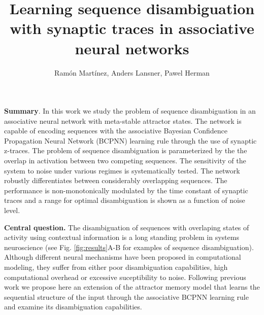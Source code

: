\documentclass[12pt, a4paper]{article}
\title{\vspace{-1.8cm} \myfont Learning sequence disambiguation with synaptic traces in associative neural networks}
\author{\myfont  Ram\'on Mart\'inez, Anders Lansner, Pawel Herman}
\begin{document}
\date{}
\maketitle



\textbf{Summary}. In this work we study the problem of sequence disambiguation in an associative neural network with meta-stable attractor states. The network is capable of encoding sequences with the associative Bayesian Confidence Propagation Neural Network (BCPNN) learning rule through the use of synaptic z-traces. The problem of sequence disambiguation is parameterized by the the overlap in activation between two competing sequences. The sensitivity of the system to noise under various regimes is systematically tested. The network robustly differentiates between considerably overlapping sequences. The performance is non-monotonically modulated by the time constant of synaptic traces and a range for optimal disambiguation is shown as a function of noise level. 

\textbf{Central question.} The disambiguation of sequences with overlaping states of activity using contextual information is a long standing problem in systems neuroscience \cite{levy1996sequence} (see Fig. \ref{fig:results}A-B for examples of sequence disambiguation). Although different neural mechanisms have been proposed in computational modeling, they suffer from either poor disambiguation capabilities, high computational overhead or excessive suceptibility to noise. Following previous work \cite{tully2016spike, lansner2009associative} we propose here an extension of the attractor memory model that learns the sequential structure of the input through the associative BCPNN learning rule and examine its disambiguation capabilities.


\end{document}

